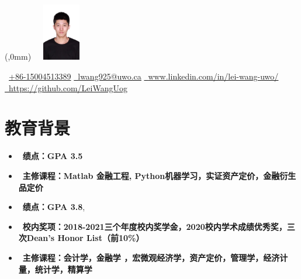 \documentclass{resume}
\begin{document}
\begin{textblock*}{0mm}(\paperwidth-38mm,0mm) %
    \includegraphics[width=25mm,height=25mm]{CHN/resume-master/生活照.jpg}
\end{textblock*}




 

\begin{center}
    \faPhone \ \small  \underline{+86-15004513389} \quad %
    \href{mailto:lwang925@uwo.ca}{\faEnvelope \ \underline{lwang925@uwo.ca}} \quad %
    \href{https://www.linkedin.com/in/lei-wang-uwo/}{\faLinkedin \ \underline{www.linkedin.com/in/lei-wang-uwo/}} \quad %
    \href{https://github.com/LeiWangUog/}{\faGithub \ \underline{https://github.com/LeiWangUog}} %
    \end{center}
 

\vspace{-7pt}
\section{教育背景}
\begin{itemize}[itemsep=0.2ex, parsep=0ex]
\item\ \textbf{绩点：GPA 3.5} 
\item\ \textbf{主修课程：Matlab 金融工程, Python机器学习，实证资产定价，金融衍生品定价}

 \end{itemize}
 \vspace{-5pt}
\begin{itemize}[itemsep=0.2ex, parsep=0ex]
\item\ \textbf{绩点：GPA 3.8},
\item\ \textbf{校内奖项：2018-2021三个年度校内奖学金，2020校内学术成绩优秀奖，三次Dean's Honor List（前10\%）}
\item\ \textbf{主修课程：会计学，金融学 ，宏微观经济学，资产定价，管理学，经济计量，统计学，精算学}
 \end{itemize}
 \vspace{-7pt}
\end{document}
